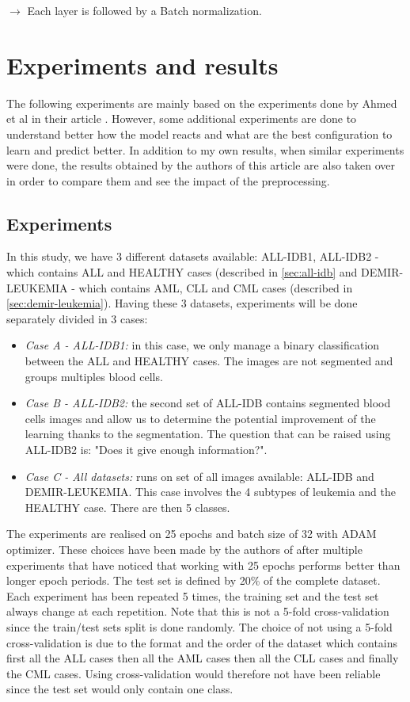 \documentclass[11pt, openany]{report}
\theoremstyle{plain}
\theoremstyle{definition}
\theoremstyle{remark}
\begin{document}
$\rightarrow$ Each layer is followed by a Batch normalization. 

\newpage
\section{Experiments and results}

The following experiments are mainly based on the experiments done by Ahmed et al in their article \cite{leukemia}. However, some additional experiments are done to understand better how the model reacts and what are the best configuration to learn and predict better. In addition to my own results, when similar experiments were done, the results obtained by the authors of this article are also taken over in order to compare them and see the impact of the preprocessing. 

\subsection{Experiments}

In this study, we have 3 different datasets available: ALL-IDB1, ALL-IDB2 - which contains ALL and HEALTHY cases (described in \autoref{sec:all-idb} and DEMIR-LEUKEMIA - which contains AML, CLL and CML cases (described in \autoref{sec:demir-leukemia}). Having these 3 datasets, experiments will be done separately divided in 3 cases: 

\begin{itemize}
\item \textit{Case A - ALL-IDB1:} in this case, we only manage a binary classification between the ALL and HEALTHY cases. The images are not segmented and groups multiples blood cells. 

\item \textit{Case B - ALL-IDB2:} the second set of ALL-IDB contains segmented blood cells images and allow us to determine the potential improvement of the learning thanks to the segmentation. The question that can be raised using ALL-IDB2 is: "Does it give enough information?". 

\item \textit{Case C - All datasets:} runs on set of all images available: ALL-IDB and DEMIR-LEUKEMIA. This case involves the 4 subtypes of leukemia and the HEALTHY case. There are then 5 classes. 
\end{itemize}   


The experiments are realised on 25 epochs and batch size of 32 with ADAM optimizer. These choices have been made by the authors of \cite{leukemia} after multiple experiments that have noticed that working with 25 epochs performs better than longer epoch periods. The test set is defined by 20\% of the complete dataset. Each experiment has been repeated 5 times, the training set and the test set always change at each repetition. Note that this is not a 5-fold cross-validation since the train/test sets split is done randomly. The choice of not using a 5-fold cross-validation is due to the format and the order of the dataset which contains first all the ALL cases then all the AML cases then all the CLL cases and finally the CML cases. Using cross-validation would therefore not have been reliable since the test set would only contain one class. 
\end{document}
